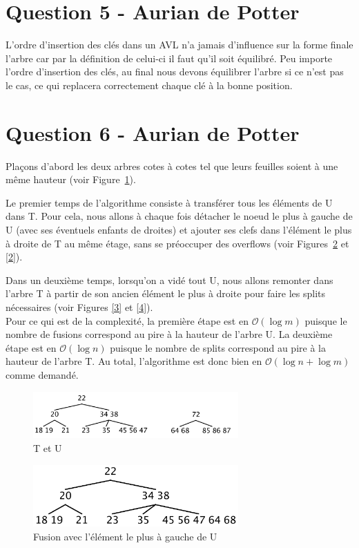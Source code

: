 \documentclass[10pt,a4paper]{article}
\begin{document}
\section*{Question 5 - Aurian de Potter}
L'ordre d'insertion des clés dans un AVL n'a jamais d'influence sur la forme finale l'arbre car par la définition de celui-ci il faut qu'il soit équilibré. Peu importe l'ordre d'insertion des clés, au final nous devons équilibrer l'arbre si ce n'est pas le cas, ce qui replacera correctement chaque clé à la bonne position.
\section*{Question 6 - Aurian de Potter}
Plaçons d'abord les deux arbres cotes à cotes tel que leurs feuilles soient à une même hauteur (voir Figure~\ref{TU}).

Le premier temps de l'algorithme consiste à transférer tous les éléments de U dans T. Pour cela, nous allons à chaque fois détacher le noeud le plus à gauche de U (avec ses éventuels enfants de droites) et ajouter ses clefs dans l'élément le plus à droite de T au même étage, sans se préoccuper des overflows (voir Figures~\ref{1} et \ref{2}).

Dans un deuxième temps, lorsqu'on a vidé tout U, nous allons remonter dans l'arbre T à partir de son ancien élément le plus à droite pour faire les splits nécessaires (voir Figures \ref{3} et \ref{4}).\\

Pour ce qui est de la complexité, la première étape est en $\mathcal{O}(\log m)$ puisque le nombre de fusions correspond au pire à la hauteur de l'arbre U. La deuxième étape est en $\mathcal{O}(\log n)$ puisque le nombre de splits correspond au pire à la hauteur de l'arbre T. Au total, l'algorithme est donc bien en $\mathcal{O}(\log n + \log m)$ comme demandé.

\begin{figure}[!h]
	\begin{center}
		\includegraphics[width=0.7\textwidth]{TU.png}
		\caption{T et U}
		\label{TU}
	\end{center}
\end{figure}

\begin{figure}[!h]
	\begin{center}
		\includegraphics[width=0.7\textwidth]{1.png}
		\caption{Fusion avec l'élément le plus à gauche de U}
		\label{1}
	\end{center}
\end{figure}
\end{document}
